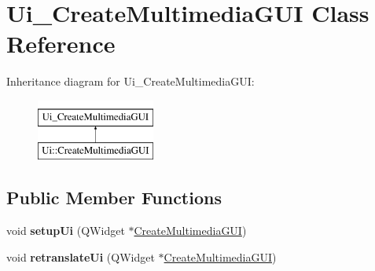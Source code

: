 \hypertarget{classUi__CreateMultimediaGUI}{}\section{Ui\+\_\+\+Create\+Multimedia\+G\+UI Class Reference}
\label{classUi__CreateMultimediaGUI}
Inheritance diagram for Ui\+\_\+\+Create\+Multimedia\+G\+UI\+:\begin{figure}[H]
\begin{center}
\leavevmode
\includegraphics[height=2.000000cm]{classUi__CreateMultimediaGUI}
\end{center}
\end{figure}
\subsection*{Public Member Functions}
\begin{DoxyCompactItemize}
\item 
void {\bfseries setup\+Ui} (Q\+Widget $\ast$\hyperlink{classCreateMultimediaGUI}{Create\+Multimedia\+G\+UI})\hypertarget{classUi__CreateMultimediaGUI_a0a7c9b868376fe9894a5fcc1fa18e522}{}\label{classUi__CreateMultimediaGUI_a0a7c9b868376fe9894a5fcc1fa18e522}

\item 
void {\bfseries retranslate\+Ui} (Q\+Widget $\ast$\hyperlink{classCreateMultimediaGUI}{Create\+Multimedia\+G\+UI})\hypertarget{classUi__CreateMultimediaGUI_a9c496541bb4e0d5b857c9c6860ccbee3}{}\label{classUi__CreateMultimediaGUI_a9c496541bb4e0d5b857c9c6860ccbee3}

\end{DoxyCompactItemize}
